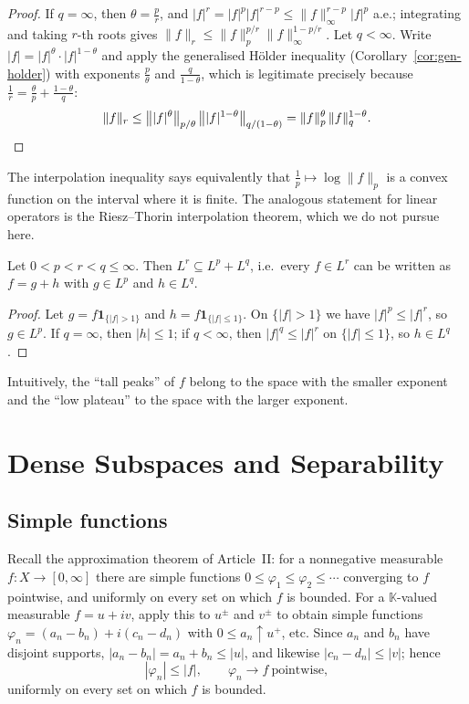 \documentclass[11pt]{article}
\newcommand{\K}{\mathbb{K}}
\newcommand{\norm}[1]{\lVert #1\rVert}
\newcommand{\ind}{\mathbf{1}}
\begin{document}
\begin{proof}
If $q=\infty$, then $\theta=\frac pr$, and $|f|^{r}=|f|^{p}|f|^{r-p}\le\norm{f}_{\infty}^{r-p}|f|^{p}$ a.e.; integrating and taking $r$-th roots gives $\norm{f}_{r}\le\norm{f}_{p}^{p/r}\norm{f}_{\infty}^{1-p/r}$. Let $q<\infty$. Write $|f|=|f|^{\theta}\cdot|f|^{1-\theta}$ and apply the generalised Hölder inequality (Corollary~\ref{cor:gen-holder}) with exponents $\frac{p}{\theta}$ and $\frac{q}{1-\theta}$, which is legitimate precisely because $\frac1r=\frac{\theta}{p}+\frac{1-\theta}{q}$:
\[
\norm{f}_{r}\le\bigl\||f|^{\theta}\bigr\|_{p/\theta}\,\bigl\||f|^{1-\theta}\bigr\|_{q/(1-\theta)}=\norm{f}_{p}^{\theta}\,\norm{f}_{q}^{1-\theta}. \qedhere
\]
\end{proof}

\begin{remark}
The interpolation inequality says equivalently that $\frac1p\mapsto\log\norm{f}_{p}$ is a convex function on the interval where it is finite. The analogous statement for linear operators is the Riesz--Thorin interpolation theorem, which we do not pursue here.
\end{remark}

\begin{corollary}\label{cor:sum}
Let $0<p<r<q\le\infty$. Then $L^{r}\subseteq L^{p}+L^{q}$, i.e.\ every $f\in L^{r}$ can be written as $f=g+h$ with $g\in L^{p}$ and $h\in L^{q}$.
\end{corollary}

\begin{proof}
Let $g=f\ind_{\{|f|>1\}}$ and $h=f\ind_{\{|f|\le1\}}$. On $\{|f|>1\}$ we have $|f|^{p}\le|f|^{r}$, so $g\in L^{p}$. If $q=\infty$, then $|h|\le1$; if $q<\infty$, then $|f|^{q}\le|f|^{r}$ on $\{|f|\le1\}$, so $h\in L^{q}$.
\end{proof}

Intuitively, the ``tall peaks'' of $f$ belong to the space with the smaller exponent and the ``low plateau'' to the space with the larger exponent.

\section{Dense Subspaces and Separability}

\subsection{Simple functions}

Recall the approximation theorem of Article~II: for a nonnegative measurable $f:X\to[0,\infty]$ there are simple functions $0\le\varphi_{1}\le\varphi_{2}\le\cdots$ converging to $f$ pointwise, and uniformly on every set on which $f$ is bounded. For a $\K$-valued measurable $f=u+iv$, apply this to $u^{\pm}$ and $v^{\pm}$ to obtain simple functions $\varphi_{n}=(a_{n}-b_{n})+i(c_{n}-d_{n})$ with $0\le a_{n}\uparrow u^{+}$, etc. Since $a_{n}$ and $b_{n}$ have disjoint supports, $|a_{n}-b_{n}|=a_{n}+b_{n}\le|u|$, and likewise $|c_{n}-d_{n}|\le|v|$; hence
\[
|\varphi_{n}|\le|f|,\qquad \varphi_{n}\to f\ \text{pointwise},
\]
uniformly on every set on which $f$ is bounded.
\end{document}

